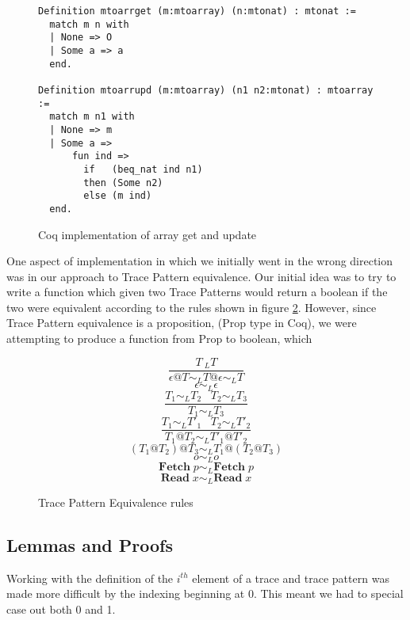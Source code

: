 \documentclass[10pt,  onecolumn]{article}
\begin{document}
\begin{figure}
\caption{ Coq implementation of array get and update}
\label{fig:coq_arrays}

\begin{lstlisting}
Definition mtoarrget (m:mtoarray) (n:mtonat) : mtonat :=
  match m n with
  | None => O
  | Some a => a
  end.

Definition mtoarrupd (m:mtoarray) (n1 n2:mtonat) : mtoarray :=
  match m n1 with
  | None => m
  | Some a =>
      fun ind =>
        if   (beq_nat ind n1)
        then (Some n2)
        else (m ind)
  end.
\end{lstlisting}

\end{figure}


One aspect of implementation in which we initially went in the wrong direction was in our approach to Trace Pattern equivalence.
Our initial idea was to try to write a function which given two Trace Patterns would return a boolean if the two were equivalent according to the rules shown in figure \ref{fig:mto_TracePat_equiv}.
However, since Trace Pattern equivalence is a proposition, (Prop type in Coq), we were attempting to produce a function from Prop to boolean, which 


\begin{figure}
\caption{Trace Pattern Equivalence rules}
\label{fig:mto_TracePat_equiv}
\[
\frac {T ~_L T}
        {\epsilon @T  \sim_{L}T@\epsilon  \sim_{L} T}
\]
\[
\epsilon \sim_{L}  \epsilon
\]
\[
\frac {T_1 \sim_L T_2 \;\;\; T_2 \sim_L T_3}
        {T_1 \sim_L T_3}
\]
\[
\frac {T_1 \sim_L T'_1 \;\;\; T_2 \sim_L T'_2}
        {T_1@T_2 \sim_L T'_1@T'_2}
\]
\[
(T_1@T_2)@T_3 \sim_L T_1@(T_2@T_3)
\]
\[
o \sim_L o
\]
\[
\textbf{Fetch}\;p \sim_L \textbf{Fetch}\;p
\]
\[
\textbf{Read}\;x \sim_L \textbf{Read}\;x
\]


\end{figure}










\subsection{ Lemmas and Proofs }

Working with the definition of  the $i^{th}$ element of a trace and trace pattern was made more difficult by the indexing beginning at 0.
This meant we had to special case out both 0 and 1. 
\end{document}
